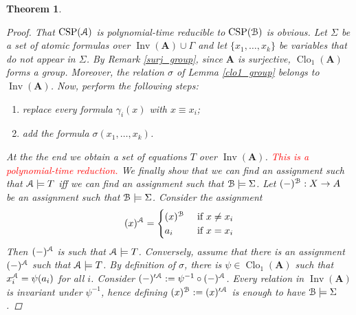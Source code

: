 \documentclass{amsart}
\theoremstyle{plain}
\newtheorem{theorem}{Theorem}[section]
\theoremstyle{definition}
\theoremstyle{remark}
\DeclareMathOperator{\Clo}{Clo}
\DeclareMathOperator{\CSP}{CSP}
\DeclareMathOperator{\Inv}{Inv}
\begin{document}
\begin{theorem}
\begin{proof}
    That $\CSP(\EuScript{A})$ is polynomial-time reducible to $\CSP(\EuScript{B})$ is obvious.
    Let $\Sigma$ be a set of atomic formulas over $\Inv(\mathbf{A}) \cup \Gamma$ and let $\{x_1, \ldots, x_k\}$ be variables that do not appear in $\Sigma$. 
    By Remark \ref{surj_group}, since $\mathbf{A}$ is surjective, $\Clo_1(\mathbf{A})$ forms a group. 
    Moreover, the relation $\sigma$ of Lemma \ref{clo1_group} belongs to $\Inv(\mathbf{A})$. 
    Now, perform the following steps: 
        \begin{enumerate}
            \item replace every formula $\gamma_i(x)$ with $x \equiv x_i$; 
            \item add the formula $\sigma(x_1, \ldots, x_k)$. 
        \end{enumerate}
    At the the end we obtain a set of equations $T$ over $\Inv(\mathbf{A})$. 
    \textcolor{red}{This is a polynomial-time reduction.}
    We finally show that we can find an assignment such that $\EuScript{A} \models T$ iff we can find an assignment such that $\EuScript{B} \models \Sigma$.
    Let $(-)^{\EuScript{B}}: X \to A$ be an assignment such that $\EuScript{B} \models \Sigma$. 
    Consider the assignment 
    \begin{equation*}
        (x)^{\EuScript{A}} = 
        \begin{cases}
            (x)^{\EuScript{B}} & \text{ if } x \neq x_i \\
            a_i & \text{ if } x = x_i 
        \end{cases}
    \end{equation*}
    Then $(-)^\EuScript{A}$ is such that $\EuScript{A} \models T$.  
    Conversely, assume that there is an assignment $(-)^{\EuScript{A}}$ such that $\EuScript{A} \models T$. 
    By definition of $\sigma$, there is $\psi \in \Clo_1(\mathbf{A})$ such that $x_i^{\EuScript{A}} = \psi(a_i)$ for all $i$. 
    Consider $(-)'^{\EuScript{A}}:=\psi^{-1}\circ(-)^{\EuScript{A}}$. 
    Every relation in $\Inv(\mathbf{A})$ is invariant under $\psi^{-1}$, hence defining $(x)^{\EuScript{B}}:=(x)'^{\EuScript{A}}$ is enough to have $\EuScript{B} \models \Sigma$.  
\end{proof}
\end{theorem}
\end{document}

